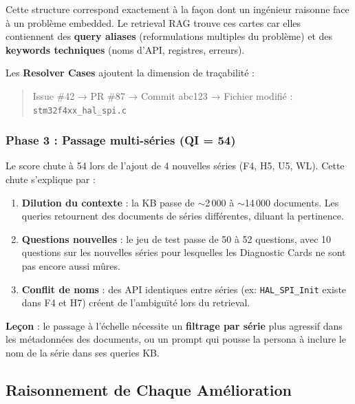 \documentclass[12pt,a4paper]{report}
\begin{document}
Cette structure correspond exactement à la façon dont un ingénieur raisonne face à un problème embedded. Le retrieval RAG trouve ces cartes car elles contiennent des \textbf{query aliases} (reformulations multiples du problème) et des \textbf{keywords techniques} (noms d'API, registres, erreurs).

Les \textbf{Resolver Cases} ajoutent la dimension de traçabilité :
\begin{quote}
Issue \#42 → PR \#87 → Commit abc123 → Fichier modifié : \texttt{stm32f4xx\_hal\_spi.c}
\end{quote}

\subsubsection{Phase 3 : Passage multi-séries (QI = 54)}

Le score chute à 54 lors de l'ajout de 4 nouvelles séries (F4, H5, U5, WL). Cette chute s'explique par :

\begin{enumerate}
  \item \textbf{Dilution du contexte} : la KB passe de $\sim$2\,000 à $\sim$14\,000 documents. Les queries retournent des documents de séries différentes, diluant la pertinence.
  \item \textbf{Questions nouvelles} : le jeu de test passe de 50 à 52 questions, avec 10 questions sur les nouvelles séries pour lesquelles les Diagnostic Cards ne sont pas encore aussi mûres.
  \item \textbf{Conflit de noms} : des API identiques entre séries (ex: \texttt{HAL\_SPI\_Init} existe dans F4 et H7) créent de l'ambiguïté lors du retrieval.
\end{enumerate}

\textbf{Leçon} : le passage à l'échelle nécessite un \textbf{filtrage par série} plus agressif dans les métadonnées des documents, ou un prompt qui pousse la persona à inclure le nom de la série dans ses queries KB.

\subsection{Raisonnement de Chaque Amélioration}
\end{document}
